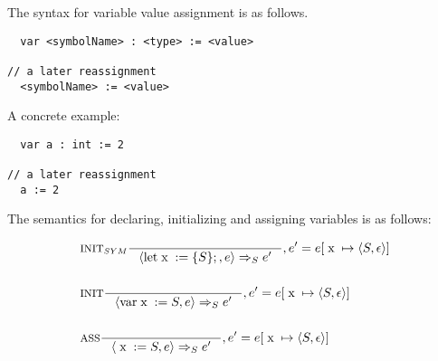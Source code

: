 The syntax for variable value assignment is as follows.

\begin{verbatim}
  var <symbolName> : <type> := <value>

// a later reassignment
  <symbolName> := <value>
\end{verbatim}
A concrete example:

\begin{verbatim}
  var a : int := 2
  
// a later reassignment
  a := 2
\end{verbatim}

The semantics for declaring, initializing and assigning variables is as follows:

\begin{align*}
&\inference[$\text{INIT}_{SYM}$]{}
                         {\Braket{\Tlet \Tx := \{S\};,e} \Rightarrow_S e'}
												 {, e' = e[\Tx \mapsto \Braket{S,\epsilon}]}
\\\\
&\inference[$\text{INIT}$]{}
                         {\Braket{\Tvar \Tx := S,e} \Rightarrow_S e'}
												 {, e' = e[\Tx \mapsto \Braket{S,\epsilon}]}
\\\\
&\inference[ASS]{}
                 {\Braket{\Tx := S,e} \Rightarrow_S e'}
								 {, e' = e[\Tx \mapsto \Braket{S,\epsilon}]}
\end{align*}